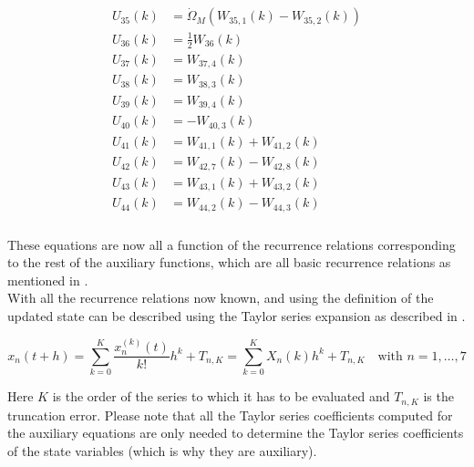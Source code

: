 \begin{align} \label{eq:allRecRel4}
\begin{split}
U_{35} \left(k\right)&= \dot{\Omega}_{M}\left(W_{35,1}\left(k\right)-W_{35,2}\left(k\right)\right) \\ 
U_{36} \left(k\right)&= \frac{1}{2}W_{36}\left(k\right) \\
U_{37} \left(k\right)&= W_{37,4}\left(k\right) \\
U_{38} \left(k\right)&= W_{38,3}\left(k\right) \\
U_{39} \left(k\right)&= W_{39,4}\left(k\right) \\
U_{40} \left(k\right)&= -W_{40,3}\left(k\right) \\
U_{41} \left(k\right)&= W_{41,1}\left(k\right)+W_{41,2}\left(k\right) \\
U_{42} \left(k\right)&= W_{42,7}\left(k\right)-W_{42,8}\left(k\right) \\
U_{43} \left(k\right)&= W_{43,1}\left(k\right)+W_{43,2}\left(k\right) \\
U_{44} \left(k\right)&= W_{44,2}\left(k\right)-W_{44,3}\left(k\right) \\
\end{split}
\end{align}

These equations are now all a function of the recurrence relations corresponding to the rest of the auxiliary functions, which are all basic recurrence relations as mentioned in . \\

With all the recurrence relations now known, and using the definition of  the updated state can be described using the Taylor series expansion as described in .

\begin{equation} \label{eq:TSexp}
x_{n}\left(t+h\right)=\displaystyle\sum_{k=0}^{K}\dfrac{x_{n}^{\left( k\right)}\left(t\right)}{k!}h^{k}+T_{n,K}=\displaystyle\sum_{k=0}^{K}X_{n}\left( k \right) h^{k}+T_{n,K} \quad \text{with }n=1,\dotsc,7
\end{equation}

Here $K$ is the order of the series to which it has to be evaluated and $T_{n,K}$ is the truncation error. Please note that all the Taylor series coefficients computed for the auxiliary equations are only needed to determine the Taylor series coefficients of the state variables (which is why they are auxiliary).





%


%


